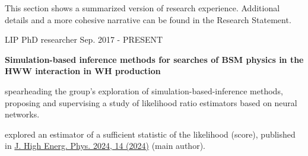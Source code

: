 
This section shows a summarized version of research experience. Additional details and a more cohesive narrative can be found in the Research Statement.

\begin{cventries}

    \cventry
    {LIP}
    {PhD researcher}
    {}
    {Sep. 2017 - PRESENT}
    {
        \textbf{Simulation-based inference methods for searches of BSM physics in the HWW interaction in WH production}\vspace{12pt}
        \begin{cvitems}      
            \item {spearheading the group's exploration of simulation-based-inference methods, proposing and supervising a study of likelihood ratio estimators based on neural networks.}
            \item {explored an estimator of a sufficient statistic of the likelihood (score), published in \href{https://doi.org/10.1007/JHEP04(2024)014}{J. High Energ. Phys. 2024, 14 (2024)} (main author).}
        \end{cvitems}
    }


\end{cventries}

